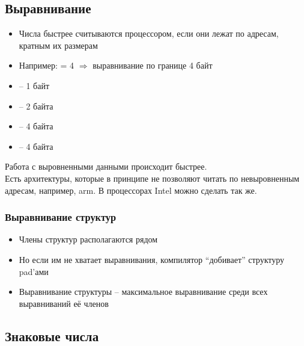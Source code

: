   \subsection{Выравнивание}
    \begin{itemize}
      \item Числа быстрее считываются процессором, если они лежат по адресам, кратным их размерам
      \item Например:  = 4 $\Rightarrow$ выравнивание по границе 4 байт
      \item {} -- 1 байт
      \item {} -- 2 байта
      \item {} -- 4 байта
      \item {} -- 4 байта
    \end{itemize}
    
    Работа с выровненными данными происходит быстрее.\\
    Есть архитектуры, которые в принципе не позволяют читать по невыровненным адресам, например, arm. В процессорах Intel можно сделать так же.
    
  \subsubsection{Выравнивание структур}
    \begin{itemize}
      \item Члены структур располагаются рядом
      \item Но если им не хватает выравнивания, компилятор ``добивает'' структуру pad'ами
      \item Выравнивание структуры -- максимальное выравнивание среди всех выравниваний её членов
    \end{itemize}
    
  \subsection{Знаковые числа}
